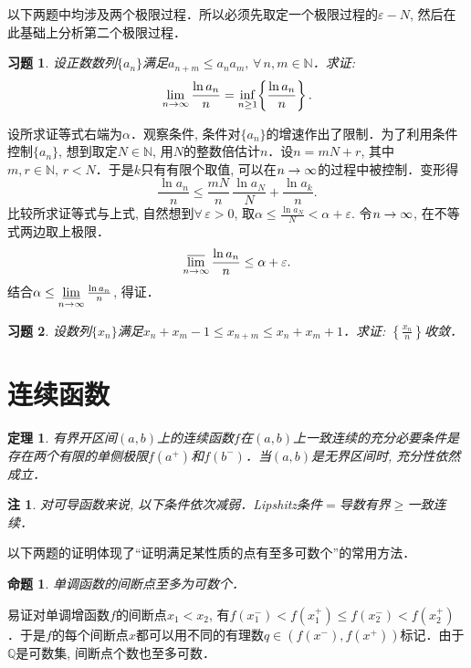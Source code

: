 \documentclass[11pt,a4paper]{ctexart}
\makeatletter
\theoremstyle{thmseries} %
\newtheorem{thm}{定理}[section]
\newtheorem{prop}{命题}[section]
\theoremstyle{exerseries}
\newtheorem{exer}{习题}[section]
\newtheorem*{rem}{注}
\renewenvironment{proof}[1][\proofname]{\par
  \pushQED{\qed}%
  \normalfont \topsep6\p@\@plus6\p@\relax
  \trivlist
  \item[\hskip\labelsep
        \itshape
    #1\@addpunct{}]\ignorespaces
}{%
  \popQED\endtrivlist\@endpefalse
}
\newenvironment{pf}{\begin{proof}[\bfseries\upshape 证\quad]}{\end{proof}}
\newcommand{\bra}[1]{\mathopen{}\left(#1\right)}
\newcommand{\cbra}[1]{\mathopen{}\left\{#1\right\}}
\renewcommand{\epsilon}{\varepsilon}
\newcommand{\N}{\mathbb{N}}
\newcommand{\Q}{\mathbb{Q}}
\def \nti {\mathnormal{n}\to\infty}
\DeclareMathOperator{\llim}{\underset{\nti}{\underline{\lim}}}
\DeclareMathOperator{\ulim}{\underset{\nti}{\overline{\lim}}}
\makeatother
\begin{document}
以下两题中均涉及两个极限过程．所以必须先取定一个极限过程的$\epsilon-N$, 然后在此基础上分析第二个极限过程．
\begin{exer}
	设正数数列$\{a_n\}$满足$a_{n+m}\leq a_na_m,\,\forall\,n,m\in\N$．求证:
	\[\lim_{\nti}\frac{\ln a_n}{n}=\inf_{n\geq 1}\cbra{\frac{\ln a_n}{n}}.\]
\end{exer}
\begin{pf}
	设所求证等式右端为$\alpha$．观察条件, 条件对$\{a_n\}$的增速作出了限制．为了利用条件控制$\{a_n\}$, 想到取定$N\in\N$, 用$N$的整数倍估计$n$．设$n=mN+r$, 其中$m,r\in\N,\,r<N$．于是$k$只有有限个取值, 可以在$\nti$的过程中被控制．变形得
	\[\frac{\ln a_n}{n}\leq\frac{mN}{n}\,\frac{\ln a_N}{N}+\frac{\ln a_k}{n}.\]
	比较所求证等式与上式, 自然想到$\forall\,\epsilon>0$, 取$\alpha\leq\frac{\ln a_N}{N}<\alpha+\epsilon.$
	令$\nti$, 在不等式两边取上极限．
	\[\ulim\frac{\ln a_n}{n}\leq\alpha+\epsilon.\]
	结合$\alpha\leq\llim\frac{\ln a_n}{n}$, 得证．
\end{pf}

\begin{exer}
	设数列$\{x_n\}$满足$x_n+x_m-1\leq x_{n+m}\leq x_n+x_m+1$．求证: $\cbra{\frac{x_n}{n}}$收敛．
\end{exer}


\section{连续函数}
\begin{thm}
	有界开区间$(a,b)$上的连续函数$f$在$(a,b)$上一致连续的充分必要条件是存在两个有限的单侧极限$f(a^+)$和$f(b^-)$．当$(a,b)$是无界区间时, 充分性依然成立．
\end{thm}
\begin{rem}
	对可导函数来说, 以下条件依次减弱．Lipshitz条件$=$导数有界$\geq$一致连续．
\end{rem}


以下两题的证明体现了``证明满足某性质的点有至多可数个''的常用方法．
\begin{prop}
	单调函数的间断点至多为可数个．
\end{prop}
\begin{pf}
	易证对单调增函数$f$的间断点$x_1<x_2$, 有$f(x_1^-)<f(x_1^+)\leq f(x_2^-)<f(x_2^+)$．于是$f$的每个间断点$x$都可以用不同的有理数$q\in\bra{f(x^-),f(x^+)}$标记．由于$\Q$是可数集, 间断点个数也至多可数．
\end{pf}
\end{document}

